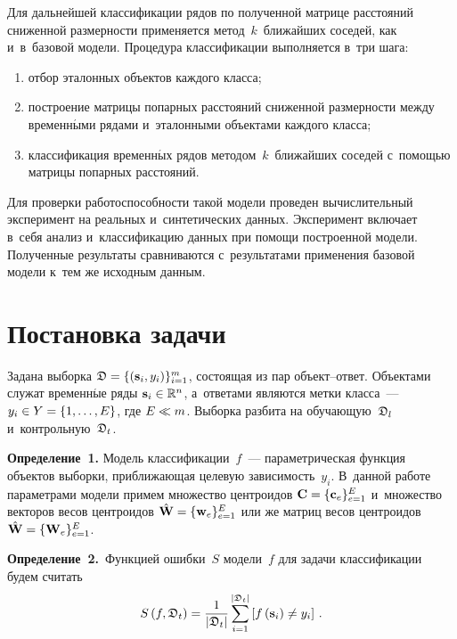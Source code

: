 \begin{multicols}{2}
Для дальнейшей классификации рядов по полученной матрице расстояний сниженной 
раз\-мер\-ности применяется метод~$k$~ближайших соседей, как и~в~базовой модели. Процедура 
классификации выполняется в~три шага:
\begin{enumerate}[(1)]
\item отбор эталонных объектов каждого 
класса;
\item построение матрицы попарных расстояний сниженной размерности 
между временн$\acute{\mbox{ы}}$ми рядами и~эталонными объектами каждого класса; 
\item классификация временн$\acute{\mbox{ы}}$х рядов методом~$k$~ближайших соседей с~помощью матрицы 
попарных расстояний.
\end{enumerate}

Для проверки работоспособности такой модели проведен вычислительный эксперимент 
на реальных и~синтетических данных. Эксперимент включает в~себя анализ и~классификацию 
данных при помощи построенной модели. Полученные результаты сравниваются с~результатами 
применения базовой модели к~тем же исходным данным.



\section{Постановка задачи}

Задана выборка $\mathfrak{D} = \{(\mathbf{s}_i,y_i)\}^m_{i=1}$, 
состоящая из пар объект--от\-вет. Объектами служат временн$\acute{\mbox{ы}}$е 
ряды $\mathbf{s}_i \hm\in \mathbb{R}^n$, а~ответами являются метки класса~---
$y_i\hm \in Y\hm= \{1,\ldots,E\}$, где $E \hm\ll m$. Выборка разбита на 
обучающую~$\mathfrak{D}_l$ и~контрольную~$\mathfrak{D}_t$.

\smallskip

\noindent
\textbf{Определение~1.} 
{Модель классификации~$f$~--- пара\-мет\-ри\-че\-ская функция объектов выборки, 
приближающая целевую зависимость~$y_i$. В~данной работе параметрами модели примем 
множество центроидов $\mathbf{C} \hm= \{\mathbf{c}_e\}_{e=1}^E$ 
и~множество векторов  весов центроидов $\hat{\mathbf{W}} \hm= \{\mathbf{w}_e\}_{e=1}^E$ 
или же матриц весов центроидов $\hat{\mathbf{W}} \hm= \{\mathbf{W}_e\}_{e=1}^E$.}

\smallskip

\noindent
\textbf{Определение~2.}\ 
Функцией ошибки~$S$ модели~$f$ для задачи классификации будем 
считать 
$$
S\left(f,\mathfrak{D}_t\right) = \displaystyle\frac{\displaystyle 1\mathstrut}{\displaystyle |\mathfrak{D}_t|\mathstrut}\sum\limits_{i=1}^{|\mathfrak{D}_t|} 
\left[f\left(\mathbf{s}_i\right)\neq y_i\right]\,.
$$


\end{multicols}
